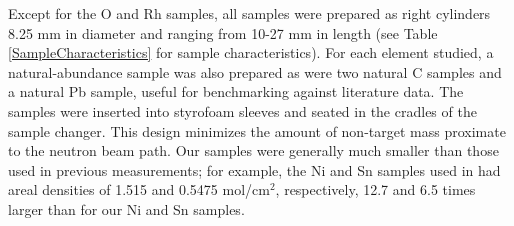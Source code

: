 \documentclass[twocolumn,secnumarabic,amssymb, nobibnotes, aps, prl,
superscriptaddress, nobalancelastpage, floatfix]{revtex4}
\begin{document}
Except for the O and Rh samples, all samples were prepared as right
cylinders 8.25 mm in diameter and ranging from 10-27 mm in length (see
Table \ref{SampleCharacteristics} for sample characteristics). 
For each element studied, a natural-abundance sample
was also prepared as were two natural C
samples and a natural Pb sample, useful for benchmarking against
literature data. The samples
were inserted into styrofoam sleeves and seated in the cradles of the sample
changer. This design minimizes the amount of non-target mass proximate to the
neutron beam path. Our samples were generally
much smaller than those used in previous measurements;
for example, the Ni and Sn samples used in \cite{Abfalterer2001,
Finlay1993} had areal densities of 1.515 and 0.5475
mol/cm$^{2}$, respectively, 12.7 and 6.5 times larger than for our
Ni and Sn samples. 
\end{document}
